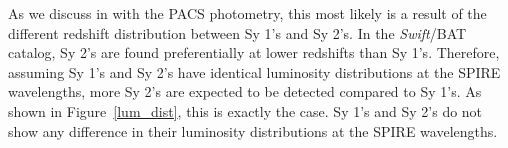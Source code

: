 As we discuss in \citet{Melendez:2014yu} with the PACS photometry, this most likely is a result of the different redshift distribution between Sy 1's and Sy 2's. In the \textit{Swift}/BAT catalog, Sy 2's are found preferentially at lower redshifts than Sy 1's. Therefore, assuming Sy 1's and Sy 2's have identical luminosity distributions at the SPIRE wavelengths, more Sy 2's are expected to be detected compared to Sy 1's. As shown in Figure~\ref{lum_dist}, this is exactly the case. Sy 1's and Sy 2's do not show any difference in their luminosity distributions at the SPIRE wavelengths. 